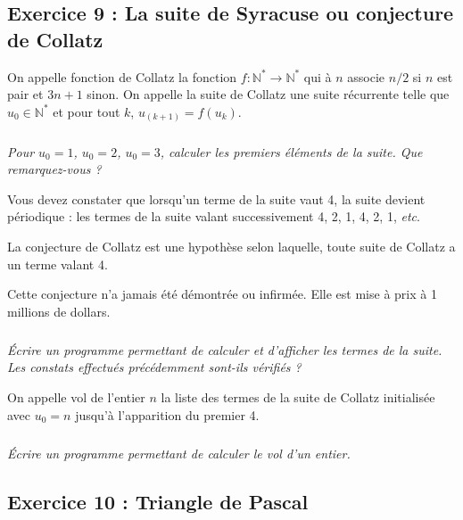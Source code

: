 \documentclass[10pt]{article}
\begin{document}
\subsection*{Exercice 9 : La suite de Syracuse ou conjecture de Collatz}
\setcounter{subparagraph}{0}

On appelle fonction de Collatz la fonction $f:\mathbb{N}^* \to  \mathbb{N}^*$ qui à $n$ associe $n/2$ si $n$ est pair et $3n+1$ sinon.
On appelle la suite de Collatz une suite récurrente telle que $u_0\in \mathbb{N}^*$ et pour tout $k$, $u_(k+1)=f(u_k)$.

\subparagraph{}
\textit{Pour $u_0=1$, $u_0=2$, $u_0=3$, calculer les premiers éléments de la suite. Que remarquez-vous ?}

\begin{rem}
	Vous devez constater que lorsqu’un terme de la suite vaut 4, la suite devient périodique : les termes de la suite valant successivement 4, 2, 1, 4, 2, 1, \textit{etc}.
	
	La conjecture de Collatz est une hypothèse selon laquelle, toute suite de Collatz a un terme valant 4.
	
	Cette conjecture n’a jamais été démontrée ou infirmée. Elle est mise à prix à 1 millions de dollars.
\end{rem}

\subparagraph{}
\textit{Écrire un programme permettant de calculer et d’afficher les termes de la suite. Les constats effectués précédemment sont-ils vérifiés ?}

On appelle vol de l’entier $n$ la liste des termes de la suite de Collatz initialisée avec $u_0=n$ jusqu’à l’apparition du premier 4. 

\subparagraph{}
\textit{Écrire un programme permettant de calculer le vol d’un entier.}



\subsection*{Exercice 10 : Triangle de Pascal}
\setcounter{subparagraph}{0}
\end{document}
